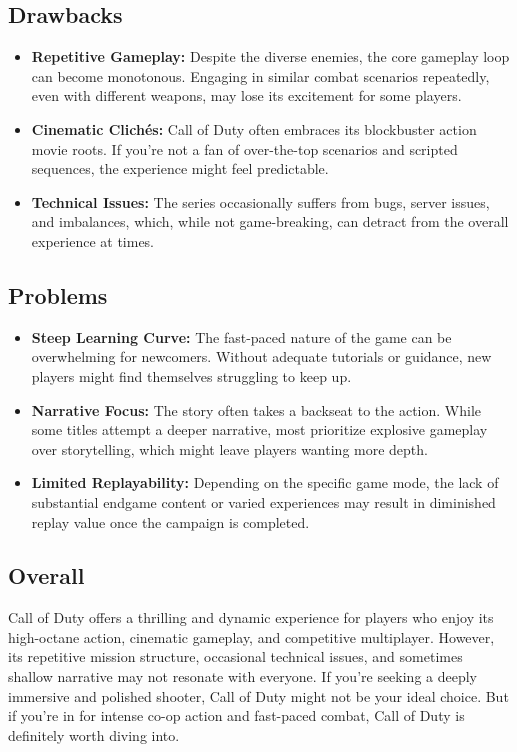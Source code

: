 \subsection{Drawbacks}
\begin{itemize}
	\item \textbf{Repetitive Gameplay:} Despite the diverse enemies, the core gameplay loop can become monotonous. Engaging in similar combat scenarios repeatedly, even with different weapons, may lose its excitement for some players.
	\item \textbf{Cinematic Clichés:} Call of Duty often embraces its blockbuster action movie roots. If you’re not a fan of over-the-top scenarios and scripted sequences, the experience might feel predictable.
	\item \textbf{Technical Issues:} The series occasionally suffers from bugs, server issues, and imbalances, which, while not game-breaking, can detract from the overall experience at times.
\end{itemize}

\subsection{Problems}
\begin{itemize}
	\item \textbf{Steep Learning Curve:} The fast-paced nature of the game can be overwhelming for newcomers. Without adequate tutorials or guidance, new players might find themselves struggling to keep up.
	\item \textbf{Narrative Focus:} The story often takes a backseat to the action. While some titles attempt a deeper narrative, most prioritize explosive gameplay over storytelling, which might leave players wanting more depth.
	\item \textbf{Limited Replayability:} Depending on the specific game mode, the lack of substantial endgame content or varied experiences may result in diminished replay value once the campaign is completed.
\end{itemize}
\subsection{Overall}
Call of Duty offers a thrilling and dynamic experience for players who enjoy its high-octane action, cinematic gameplay, and competitive multiplayer. However, its repetitive mission structure, occasional technical issues, and sometimes shallow narrative may not resonate with everyone. If you’re seeking a deeply immersive and polished shooter, Call of Duty might not be your ideal choice. But if you’re in for intense co-op action and fast-paced combat, Call of Duty is definitely worth diving into.

